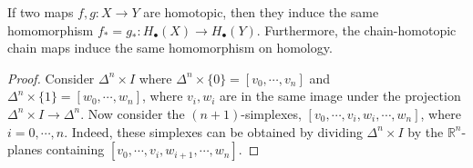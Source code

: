 \begin{thm} If two maps $f,g:X\rightarrow Y$ are homotopic, then they induce the same homomorphism $f_*=g_*:H_\bullet(X)\rightarrow H_\bullet(Y)$. Furthermore, the chain-homotopic chain maps induce the same homomorphism on homology.
\end{thm}
\begin{proof}
Consider $\Delta^n\times I$ where $\Delta^n\times \{0\}=[v_0,\cdots,v_n]$ and $\Delta^n\times \{1\}=[w_0,\cdots,w_n]$, where $v_i, w_i$ are in the same image under the projection $\Delta^n\times I\rightarrow \Delta^n$. Now consider the $(n+1)$-simplexes, $[v_0,\cdots, v_i,w_i,\cdots, w_n]$, where $i=0,\cdots,n$. Indeed, these simplexes can be obtained by dividing $\Delta^n\times I$ by the $\mathbb{R}^n$-planes containing $[v_0,\cdots,v_i,w_{i+1},\cdots,w_n]$.


\end{proof}
